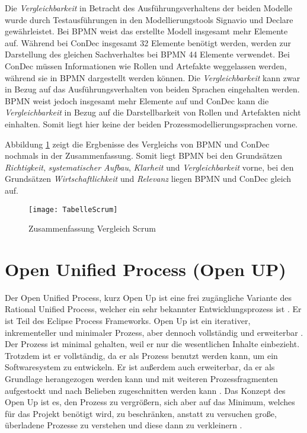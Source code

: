 Die \textit{Vergleichbarkeit} in Betracht des Ausführungsverhaltens der beiden Modelle wurde durch Testausführungen in den Modellierungstools Signavio und Declare gewährleistet.\newline
Bei BPMN weist das erstellte Modell insgesamt mehr Elemente auf. Während bei ConDec insgesamt 32 Elemente benötigt werden, werden zur Darstellung des gleichen Sachverhaltes bei BPMN 44 Elemente verwendet. \newline
Bei ConDec müssen Informationen wie Rollen und Artefakte weggelassen werden, während sie in BPMN dargestellt werden können.\newline
Die \textit{Vergleichbarkeit} kann zwar in Bezug auf das Ausführungsverhalten von beiden Sprachen eingehalten werden. BPMN weist jedoch insgesamt mehr Elemente auf und ConDec kann die \textit{Vergleichbarkeit} in Bezug auf die Darstellbarkeit von Rollen und Artefakten nicht einhalten. Somit liegt hier keine der beiden Prozessmodellierungssprachen vorne.\newline

Abbildung \ref{fig:TabelleScrum} zeigt die Ergbenisse des Vergleichs von BPMN und ConDec nochmals in der Zusammenfassung. Somit liegt BPMN bei den Grundsätzen \textit{Richtigkeit}, \textit{systematischer Aufbau}, \textit{Klarheit} und \textit{Vergleichbarkeit} vorne, bei den Grundsätzen \textit{Wirtschaftlichkeit} und \textit{Relevanz} liegen BPMN und ConDec gleich auf. \newline

\begin{figure}[htp]
\begin{center}
  \texttt{[image: TabelleScrum]} %
  \caption{Zusammenfassung Vergleich Scrum}
  \label{fig:TabelleScrum}
\end{center}
\end{figure}




\section{Open Unified Process (Open UP)}


Der Open Unified Process, kurz Open Up ist eine frei zugängliche Variante des Rational Unified Process, welcher ein sehr bekannter Entwicklungsprozess ist \cite{hauber2010}.  Er ist Teil des Eclipse Process Frameworks. Open Up ist ein iterativer, inkrementeller und minimaler Prozess, aber dennoch vollständig und erweiterbar \cite{Gau2006, Basem2010}. Der Prozess ist minimal gehalten, weil er nur die wesentlichen Inhalte einbezieht. Trotzdem ist er vollständig, da er als Prozess benutzt werden kann, um ein Softwaresystem zu entwickeln. Er ist außerdem auch erweiterbar, da er als Grundlage herangezogen werden kann und mit weiteren Prozessfragmenten aufgestockt und nach Belieben zugeschnitten werden kann \cite{Wang2007}. Das Konzept des Open Up ist es, den Prozess zu vergrößern, sich aber auf das Minimum, welches für das Projekt benötigt wird, zu beschränken, anstatt zu versuchen große, überladene Prozesse zu verstehen und diese dann zu verkleinern \cite{ambler2012}.  \newline



